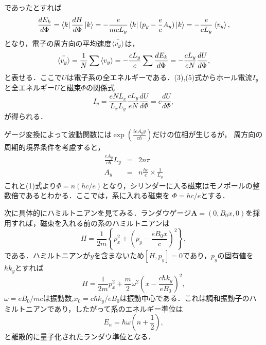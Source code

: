 \documentclass[]{jsarticle}
\begin{document}
であったとすれば
\begin{equation}
    \frac{dE_k}{d\Phi} = \bra{k} \frac{dH}{d\Phi}\ket{k} = -\frac{e}{mcL_y}\bra{k} (p_y - \frac{e}{c} A_y)\ket{k} = -\frac{e}{cL_y}\braket{v_y},
\end{equation}
となり，電子の周方向の平均速度$\bar{\braket{v_y}}$は，
\begin{equation}
    \bar{\braket{v_y}} = \frac{1}{N} \sum \braket{v_y} = -\frac{cL_y}{e}\sum\frac{dE_k}{d\Phi} = -\frac{cL_y}{eN}\frac{dU}{d\Phi},
\end{equation}
と表せる．ここで$U$は電子系の全エネルギーである．(3),(5)式からホール電流$I_y$と全エネルギー$U$と磁束$\Phi$の関係式
\begin{equation}
    I_y = \frac{eNL_x}{L_xL_y} \frac{cL_y}{eN} \frac{dU}{d\Phi} = c\frac{dU}{d\Phi},
\end{equation}
が得られる．

ゲージ変換によって波動関数には$\exp{\left(\displaystyle \frac{ieA_y y}{c\hbar}\right)}$だけの位相が生じるが，
周方向の周期的境界条件を考慮すると，
\begin{eqnarray}
    \frac{eA_y}{c\hbar} L_y &=& 2n\pi \nonumber \\
    A_y &=& n \frac{hc}{e} \times \frac{1}{L_y}
\end{eqnarray}
これと(1)式より$\Phi = n(hc/e) $となり，シリンダーに入る磁束はモノポールの整数倍であるとわかる．ここでは，系に入れる磁束を
$\Phi = hc/e$とする．

次に具体的にハミルトニアンを見てみる．ランダウゲージ$\bm{A} = (0,B_0x,0)$を採用すれば，磁束を入れる前の系のハミルトニアンは
\begin{equation}
    H = \frac{1}{2m}\left\{p_x^2 + \left(p_y - \frac{eB_0x}{c} \right)^2 \right \},
\end{equation}
である．ハミルトニアンが$y$を含まないため$[H,p_y] = 0$であり，$p_y$の固有値を$\hbar k_y$とすれば
\begin{equation}
    H = \frac{1}{2m} p_x^2  + \frac{m}{2} \omega^2 \left(x - \frac{c \hbar k_y}{eB_0} \right)^2,
\end{equation}
$\omega = eB_0/mc$は振動数,$x_0 = c\hbar k_y /eB_0$は振動中心である．これは調和振動子のハミルトニアンであり，したがって系のエネルギー準位は
\begin{equation}
    E_n = \hbar \omega \left(n + \frac{1}{2} \right),
\end{equation}
と離散的に量子化されたランダウ準位となる．
\end{document}
